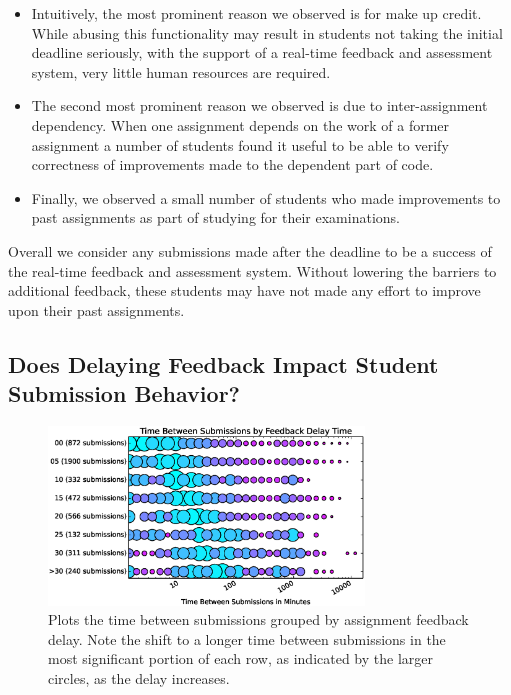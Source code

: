 \begin{itemize}
\item Intuitively, the most prominent reason we observed is for make up
  credit. While abusing this functionality may result in students not taking
  the initial deadline seriously, with the support of a real-time feedback and
  assessment system, very little human resources are required.
\item The second most prominent reason we observed is due to inter-assignment
  dependency. When one assignment depends on the work of a former assignment a
  number of students found it useful to be able to verify correctness of
  improvements made to the dependent part of code.
\item Finally, we observed a small number of students who made improvements to
  past assignments as part of studying for their examinations.
\end{itemize}

Overall we consider any submissions made after the deadline to be a success of
the real-time feedback and assessment system. Without lowering the barriers to
additional feedback, these students may have not made any effort to improve
upon their past assignments.

\subsection{Does Delaying Feedback Impact Student Submission Behavior?}

\begin{figure}[!t]
\centering \includegraphics[width=3.3in]{graphs/Time_Between_Submissions_by_Feedback_Delay_Time.eps}
\caption{Plots the time between submissions grouped by assignment feedback
  delay. Note the shift to a longer time between submissions in the most
  significant portion of each row, as indicated by the larger circles, as the
  delay increases.}
\end{figure}

